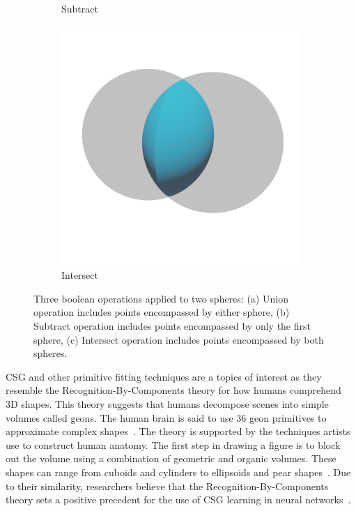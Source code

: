 \begin{figure}
\begin{subfigure}[t]{0.3\textwidth}
		\caption{Subtract}
	\end{subfigure}
	\hfill
	\begin{subfigure}[t]{0.3\textwidth}
		\centering
		\includegraphics[width=\textwidth]{Images/Intersect}
		\caption{Intersect}
	\end{subfigure}
	\caption{Three boolean operations applied to two spheres: (a) Union operation includes points encompassed by either sphere, (b) Subtract operation includes points encompassed by only the first sphere, (c) Intersect operation includes points encompassed by both spheres.}
	\label{fig:boolean operations}
\end{figure}

CSG and other primitive fitting techniques are a topics of interest as they resemble the Recognition-By-Components theory for how humans comprehend 3D shapes. This theory suggests that humans decompose scenes into simple volumes called geons. The human brain is said to use 36 geon primitives to approximate complex shapes~\cite{Biederman1987}. The theory is supported by the techniques artists use to construct human anatomy. The first step in drawing a figure is to block out the volume using a combination of geometric and organic volumes. These shapes can range from cuboids and cylinders to ellipsoids and pear shapes~\cite{Winslow2015}. Due to their similarity, researchers believe that the Recognition-By-Components theory sets a positive precedent for the use of CSG learning in neural networks~\cite{Sharma2018}.

